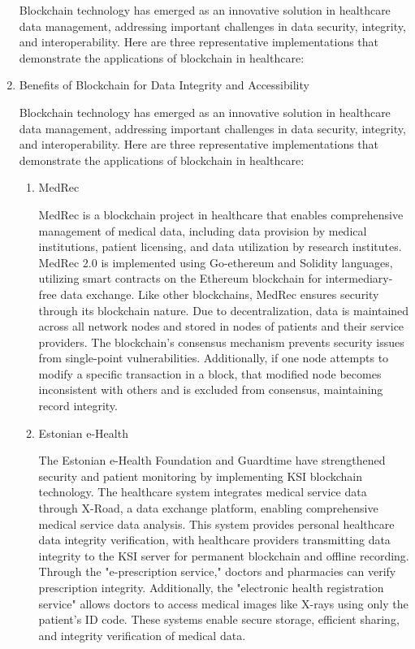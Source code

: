 \documentclass[conference]{IEEEtran}
\begin{document}
\begin{enumerate}[itemsep=2ex, parsep=1ex]
			Blockchain technology has emerged as an innovative solution in healthcare data management, addressing important challenges in data security, integrity, and interoperability. Here are three representative implementations that demonstrate the applications of blockchain in healthcare:

		\item Benefits of Blockchain for Data Integrity and Accessibility

			Blockchain technology has emerged as an innovative solution in healthcare data management, addressing important challenges in data security, integrity, and interoperability. Here are three representative implementations that demonstrate the applications of blockchain in healthcare:

			\begin{enumerate}[itemsep=2ex, parsep=1ex]
				\item MedRec

					MedRec is a blockchain project in healthcare that enables comprehensive management of medical data, including data provision by medical institutions, patient licensing, and data utilization by research institutes. MedRec 2.0 is implemented using Go-ethereum and Solidity languages, utilizing smart contracts on the Ethereum blockchain for intermediary-free data exchange. Like other blockchains, MedRec ensures security through its blockchain nature. Due to decentralization, data is maintained across all network nodes and stored in nodes of patients and their service providers. The blockchain's consensus mechanism prevents security issues from single-point vulnerabilities. Additionally, if one node attempts to modify a specific transaction in a block, that modified node becomes inconsistent with others and is excluded from consensus, maintaining record integrity.

				\item Estonian e-Health

					The Estonian e-Health Foundation and Guardtime have strengthened security and patient monitoring by implementing KSI blockchain technology. The healthcare system integrates medical service data through X-Road, a data exchange platform, enabling comprehensive medical service data analysis. This system provides personal healthcare data integrity verification, with healthcare providers transmitting data integrity to the KSI server for permanent blockchain and offline recording. Through the "e-prescription service," doctors and pharmacies can verify prescription integrity. Additionally, the "electronic health registration service" allows doctors to access medical images like X-rays using only the patient's ID code. These systems enable secure storage, efficient sharing, and integrity verification of medical data.


\end{enumerate}
\end{enumerate}
\end{document}
